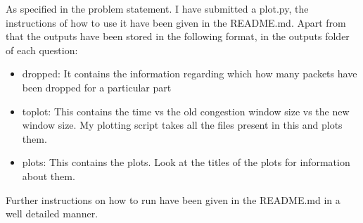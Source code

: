 \documentclass{article}
\begin{document}
As specified in the problem statement. I have submitted a plot.py, the instructions of how to use it have been given in the README.md. Apart from that the outputs have been stored in the following format, in the outputs folder of each question:
\begin{itemize}
    \item dropped: It contains the information regarding which how many packets have been dropped for a particular part
    \item toplot: This contains the time vs the old congestion window size vs the new window size. My plotting script takes all the files present in this and plots them.
    \item plots: This contains the plots. Look at the titles of the plots for information about them.
\end{itemize}
Further instructions on how to run have been given in the README.md in a well detailed manner.
\end{document}
